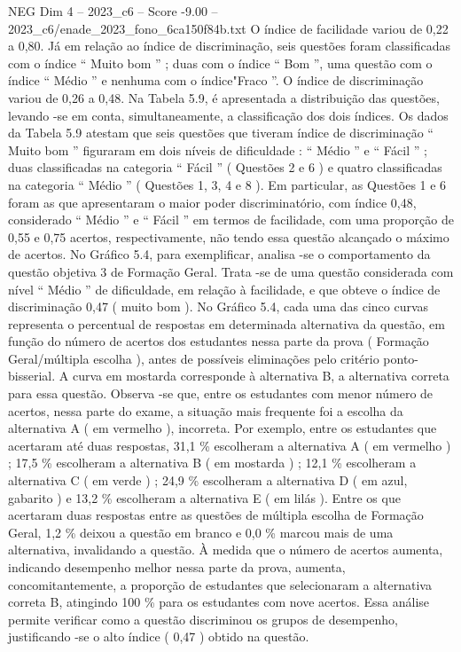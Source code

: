 \begin{textsample}{NEG Dim 4 – 2023\_c6 – Score -9.00 – 2023\_c6/enade\_2023\_fono\_6ca150f84b.txt}
O índice de facilidade variou de 0,22 a 0,80.
Já em relação ao índice de discriminação, seis questões foram classificadas com o índice “ Muito bom ” ; duas com o índice “ Bom ”, uma questão com o índice “ Médio ” e nenhuma com o índice"Fraco ”.
O índice de discriminação variou de 0,26 a 0,48.
Na Tabela 5.9, é apresentada a distribuição das questões, levando -se em conta, simultaneamente, a classificação dos dois índices.
Os dados da Tabela 5.9 atestam que seis questões que tiveram índice de discriminação “ Muito bom ” figuraram em dois níveis de dificuldade : “ Médio ” e “ Fácil ” ; duas classificadas na categoria “ Fácil ” ( Questões 2 e 6 ) e quatro classificadas na categoria “ Médio ” ( Questões 1, 3, 4 e 8 ).
Em particular, as Questões 1 e 6 foram as que apresentaram o maior poder discriminatório, com índice 0,48, considerado “ Médio ” e “ Fácil ” em termos de facilidade, com uma proporção de 0,55 e 0,75 acertos, respectivamente, não tendo essa questão alcançado o máximo de acertos.
No Gráfico 5.4, para exemplificar, analisa -se o comportamento da questão objetiva 3 de Formação Geral.
Trata -se de uma questão considerada com nível “ Médio ” de dificuldade, em relação à facilidade, e que obteve o índice de discriminação 0,47 ( muito bom ).
No Gráfico 5.4, cada uma das cinco curvas representa o percentual de respostas em determinada alternativa da questão, em função do número de acertos dos estudantes nessa parte da prova ( Formação Geral/múltipla escolha ), antes de possíveis eliminações pelo critério ponto-bisserial.
A curva em mostarda corresponde à alternativa B, a alternativa correta para essa questão.
Observa -se que, entre os estudantes com menor número de acertos, nessa parte do exame, a situação mais frequente foi a escolha da alternativa A ( em vermelho ), incorreta.
Por exemplo, entre os estudantes que acertaram até duas respostas, 31,1 \% escolheram a alternativa A ( em vermelho ) ; 17,5 \% escolheram a alternativa B ( em mostarda ) ; 12,1 \% escolheram a alternativa C ( em verde ) ; 24,9 \% escolheram a alternativa D ( em azul, gabarito ) e 13,2 \% escolheram a alternativa E ( em lilás ).
Entre os que acertaram duas respostas entre as questões de múltipla escolha de Formação Geral, 1,2 \% deixou a questão em branco e 0,0 \% marcou mais de uma alternativa, invalidando a questão.
À medida que o número de acertos aumenta, indicando desempenho melhor nessa parte da prova, aumenta, concomitantemente, a proporção de estudantes que selecionaram a alternativa correta B, atingindo 100 \% para os estudantes com nove acertos.
Essa análise permite verificar como a questão discriminou os grupos de desempenho, justificando -se o alto índice ( 0,47 ) obtido na questão.

\end{textsample}
